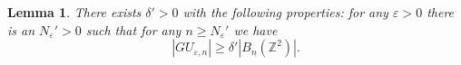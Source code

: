 \documentclass[10pt,reqno]{amsart}
\theoremstyle{Theorem}
\newtheorem{claim}[theorem]{Claim}
\newtheorem{lemma}[theorem]{Lemma}
\theoremstyle{definition}
\theoremstyle{remark}
\newcommand{\note}[1]{\marginpar{{\color{red}\footnotesize \begin{spacing}{1}#1\end{spacing}}}}
\newcommand{\noted}[1]{\marginpar{{\color{blue}\footnotesize \begin{spacing}{1}#1\end{spacing}}}}
\renewcommand{\epsilon}{\varepsilon}
\newcommand{\Z}{\mathbb {Z}}
\newcommand{\e}{\epsilon}
\newcommand{\inv}{^{-1}}
\def\blue{}
\begin{document}
%
%


\begin{lemma}\label{proportion}
There exists $\delta' > 0$ with the following properties: for any   $\e>0$ there is an $N_{\e}'>0$ such that for any $n \geq N_{\e}'$ we have  $$|GU_{\e,n}| \geq \delta' |B_n(\Z^2)|.$$
 \end{lemma}
\end{document}
